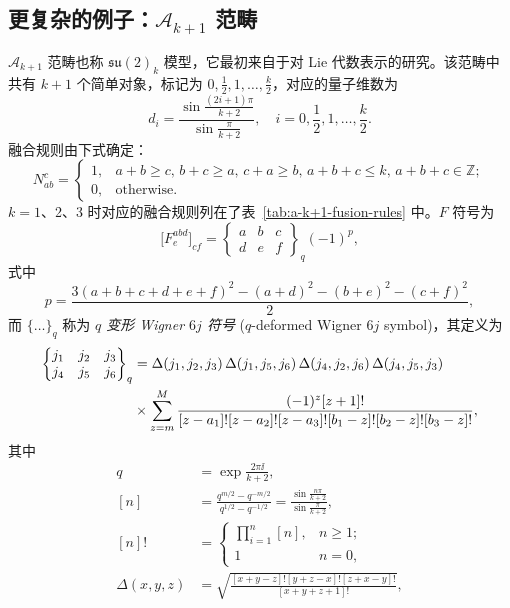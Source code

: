 \subsection{更复杂的例子：\texorpdfstring{$\mathcal{A}_{k+1}$}{𝒜ₖ₊₁} 范畴}
\label{subsec:a-k+1-category}

$\mathcal{A}_{k+1}$ 范畴\cite{coquereaux2007racah,gils2013anyonic,aasen2020topological,chen2022galois}也称 $\mathfrak{su}(2)_k$ 模型，它最初来自于对 Lie 代数表示的研究。该范畴中共有 $k+1$ 个简单对象，标记为 $0,\frac12,1,\dots,\frac k2$，对应的量子维数为
\begin{equation}
  d_i = \frac{\sin\frac{(2i+1)\pi}{k+2}}{\sin\frac{\pi}{k+2}}, \quad i = 0,\frac12,1,\dots,\frac k2.
\end{equation}
融合规则由下式确定：
\begin{equation}
  N_{ab}^c = \begin{cases}
    1, & a+b\geqslant c, \, b+c\geqslant a, \, c+a\geqslant b, \, a+b+c\leqslant k, \, a+b+c\in\mathbb{Z}; \\
    0, & \text{otherwise}.
  \end{cases}
\end{equation}
$k=1$、2、3 时对应的融合规则列在了表~\ref{tab:a-k+1-fusion-rules} 中。$F$ 符号为
\begin{equation}
  \bigl[ F^{abd}_e \bigr]_{cf} = \begin{Bmatrix} a & b & c \\ d & e & f \end{Bmatrix}_q (-1)^p,
\end{equation}
式中
\begin{equation}
  p = \frac{3(a+b+c+d+e+f)^2 - (a+d)^2 - (b+e)^2 - (c+f)^2}{2},
\end{equation}
而 $\{\dots\}_q$ 称为 \emph{$q$ 变形 Wigner $6j$ 符号} ($q$-deformed Wigner $6j$ symbol)，其定义为
\begin{align}
  \begin{Bmatrix} j_1 & j_2 & j_3 \\ j_4 & j_5 & j_6 \end{Bmatrix}_q
  &= \Delta(j_1,j_2,j_3) \, \Delta(j_1,j_5,j_6) \, \Delta(j_4,j_2,j_6) \, \Delta(j_4,j_5,j_3) \notag \\
  &\times \sum_{z=m}^M \frac{(-1)^z [z+1]!}{[z-a_1]![z-a_2]![z-a_3]! [b_1-z]![b_2-z]![b_3-z]!},
\end{align}
其中
\begin{align}
  q    &= \exp\frac{2\pi\ii}{k+2}, \\
  [n]  &= \frac{q^{m/2} - q^{-m/2}}{q^{1/2} - q^{-1/2}} = \frac{\sin\frac{n\pi}{k+2}}{\sin\frac{\pi}{k+2}}, \\
  [n]! &= \begin{cases}
    \prod_{i=1}^{n} [n], & n \geqslant 1; \\
    1                    & n = 0,
  \end{cases} \\
  \Delta(x,y,z) &= \sqrt{\frac{[x+y-z]! [y+z-x]! [z+x-y]!}{[x+y+z+1]!}},
\end{align}

